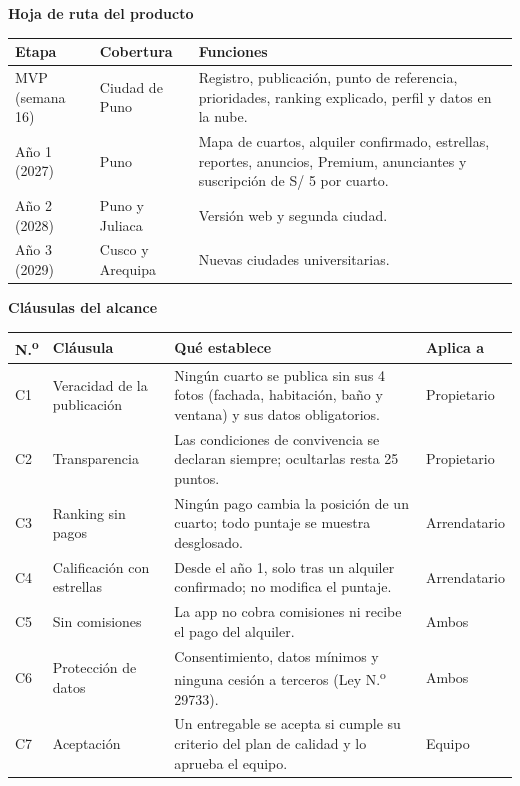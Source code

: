 \documentclass[11pt,a4paper]{article}
\begin{document}
\vspace{0.15cm}
\noindent\textbf{Hoja de ruta del producto}

\vspace{0.05cm}
{\small
{}
\noindent\begin{tabularx}{\textwidth}{@{}P{3.2cm} P{2.6cm} L@{}}
\toprule
{}
\textbf{Etapa} & \textbf{Cobertura} & \textbf{Funciones} \\
\midrule
MVP (semana 16) & Ciudad de Puno & Registro, publicación, punto de referencia, prioridades, ranking explicado, perfil y datos en la nube. \\
Año 1 (2027) & Puno & Mapa de cuartos, alquiler confirmado, estrellas, reportes, anuncios, Premium, anunciantes y suscripción de S/ 5 por cuarto. \\
Año 2 (2028) & Puno y Juliaca & Versión web y segunda ciudad. \\
Año 3 (2029) & Cusco y Arequipa & Nuevas ciudades universitarias. \\
\bottomrule
\end{tabularx}
}

\vspace{0.15cm}
\noindent\textbf{Cláusulas del alcance}

\vspace{0.05cm}
{\small
{}
\noindent\begin{tabularx}{\textwidth}{@{}C{0.7cm} P{3.0cm} L P{1.9cm}@{}}
\toprule
{}
\textbf{N.\textsuperscript{o}} & \textbf{Cláusula} & \textbf{Qué establece} & \textbf{Aplica a} \\
\midrule
C1 & Veracidad de la publicación & Ningún cuarto se publica sin sus 4 fotos (fachada, habitación, baño y ventana) y sus datos obligatorios. & Propietario \\
C2 & Transparencia & Las condiciones de convivencia se declaran siempre; ocultarlas resta 25 puntos. & Propietario \\
C3 & Ranking sin pagos & Ningún pago cambia la posición de un cuarto; todo puntaje se muestra desglosado. & Arrendatario \\
C4 & Calificación con estrellas & Desde el año 1, solo tras un alquiler confirmado; no modifica el puntaje. & Arrendatario \\
C5 & Sin comisiones & La app no cobra comisiones ni recibe el pago del alquiler. & Ambos \\
C6 & Protección de datos & Consentimiento, datos mínimos y ninguna cesión a terceros (Ley N.\textsuperscript{o} 29733). & Ambos \\
C7 & Aceptación & Un entregable se acepta si cumple su criterio del plan de calidad y lo aprueba el equipo. & Equipo \\
\bottomrule
\end{tabularx}
}
\end{document}
